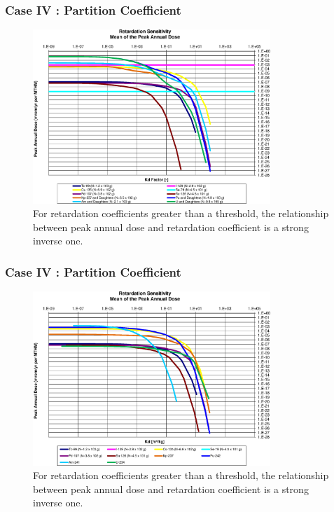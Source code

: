 \begin{frame}[c]
  \frametitle{Case IV : Partition Coefficient}

\begin{figure}[ht]
\centering
\includegraphics[width=0.8\textwidth]{Sorption/Retardation_Summary_kdFactor.eps}
\caption{
For retardation coefficients greater than a threshold, the 
relationship between peak annual dose and retardation coefficient is a strong 
inverse one. }
\label{fig:KdSumFactor}
\end{figure}
\end{frame}

\begin{frame}[c]
  \frametitle{Case IV : Partition Coefficient}

\begin{figure}[ht]
\centering
\includegraphics[width=0.8\textwidth]{Sorption/Retardation_Summary_kd.eps}
\caption{
For retardation coefficients greater than a threshold, the 
relationship between peak annual dose and retardation coefficient is a strong 
inverse one. }
\label{fig:KdSum}
\end{figure}
\end{frame}

